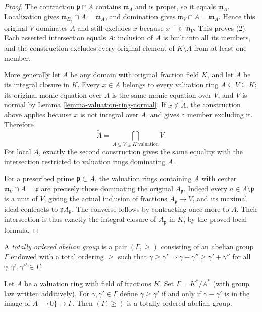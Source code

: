 \begin{proof}
The contraction $\mathfrak p\cap A$
contains $\mathfrak m_A$ and
is proper, so it equals
$\mathfrak m_A$. Localization
gives
$\mathfrak m_{B_{\mathfrak p}}\cap A=\mathfrak m_A$,
and domination gives
$\mathfrak m_V\cap A=\mathfrak m_A$.
Hence this original $V$
dominates $A$ and still
excludes $x$ because
$x^{-1}\in\mathfrak m_V$.
This proves (2). Each
asserted intersection equals
$A$: inclusion of $A$
is built into all its
members, and the construction
excludes every original element
of $K\setminus A$ from
at least one member.

More generally let $A$
be any domain with original
fraction field $K$, and
let $\widetilde A$ be its
integral closure in $K$.
Every $x\in\widetilde A$
belongs to every valuation
ring $A\subseteq V\subseteq K$:
its original monic equation
over $A$ is the same
monic equation over $V$,
and $V$ is normal by
Lemma \ref{lemma-valuation-ring-normal}.
If $x\notin\widetilde A$,
the construction above applies
because $x$ is not integral
over $A$, and gives a
member excluding it. Therefore
$$
\widetilde A=\bigcap_{A\subseteq V\subseteq K\text{ valuation}}V.
$$
For local $A$, exactly the
second construction gives
the same equality with the
intersection restricted to
valuation rings dominating $A$.

For a prescribed prime
$\mathfrak p\subset A$, the
valuation rings containing
$A$ with center
$\mathfrak m_V\cap A=\mathfrak p$
are precisely those dominating
the original $A_{\mathfrak p}$.
Indeed every $a\in A\setminus\mathfrak p$
is a unit of $V$, giving
the actual inclusion of
fractions $A_{\mathfrak p}\to V$,
and its maximal ideal
contracts to $\mathfrak pA_{\mathfrak p}$.
The converse follows by
contracting once more to
$A$. Their intersection
is thus exactly the
integral closure of
$A_{\mathfrak p}$ in $K$,
by the proved local formula.
\end{proof}

\noindent
A {\it totally ordered abelian group} is a pair $(\Gamma, \geq)$
consisting of an abelian group $\Gamma$ endowed with a total
ordering $\geq$ such that $\gamma \geq \gamma' \Rightarrow
\gamma + \gamma'' \geq \gamma' + \gamma''$ for all
$\gamma, \gamma', \gamma'' \in \Gamma$.

\begin{lemma}
\label{lemma-valuation-group}
Let $A$ be a valuation ring with field of fractions $K$.
Set $\Gamma = K^*/A^*$ (with group law written additively).
For $\gamma, \gamma' \in \Gamma$
define $\gamma \geq \gamma'$ if and only if
$\gamma - \gamma'$ is in the image of $A - \{0\} \to \Gamma$.
Then $(\Gamma, \geq)$ is a totally ordered abelian group.
\end{lemma}

